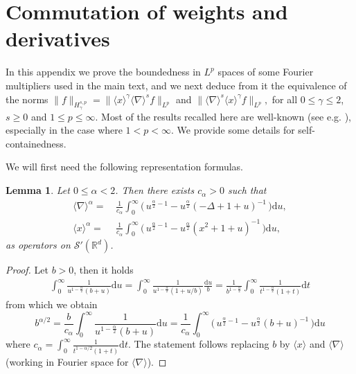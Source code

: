 \documentclass[12pt]{article}
\theoremstyle{plain}
\newtheorem{lemma}[theo]{Lemma}
\begin{document}
	
	\appendix
	
	\section{Commutation of weights and derivatives}

\label{app: commute}

In this appendix we prove the boundedness in $L^p$ spaces of some Fourier multipliers used in the main text, and we next deduce from it the equivalence of the norms $\|f\|_{H^{s,p}_\gamma}=\|\langle x \rangle ^\gamma \langle \nabla \rangle^s f \|_{L^p}$ and $\|\langle \nabla \rangle^s \langle x \rangle ^\gamma f \|_{L^p},$ for all $0\leq \gamma\leq 2$, $s\geq 0 $ and $1\le p \le \infty$. Most of the results recalled here are well-known (see e.g. \cite{Loefstroem}), especially in the case where $1<p<\infty$. We provide some details for self-containedness.

We will first need the following representation formulas.

\begin{lemma}
		\label{lemma: expr sqrt}
		Let $0\leq \alpha <2 $. Then there exists $c_\alpha>0$ such that 
		\begin{align*}
		    \langle \nabla \rangle^\alpha =&\, \frac{1}{c_\alpha} \int_0^\infty \big(\, u^{\frac\alpha2-1}- u^{\frac\alpha2} (-\Delta + 1 + u )^{-1}\, \big) \mathrm{d}u ,\\
		     \langle x \rangle^\alpha= &\,\frac{1}{c_\alpha} \int_0^\infty \big(\,u^{\frac\alpha2-1}- u^{\frac\alpha2} (x^2 +1+ u )^{-1}\, \big) \mathrm{d}u,
		\end{align*}
as operators on $\mathcal{S}'(\mathbb{R}^d)$.
	\end{lemma}
	\begin{proof}
		Let $ b>0$, then it holds
		\begin{align*}
			\int_0^\infty \frac{1}{u^{1-\frac\alpha2}(b+u)} \mathrm{d}u = \int_0^\infty \frac{1}{u^{1-\frac\alpha2}(1+u/b)}\frac{\mathrm{d}u}{b}= \frac{1}{b^{1-\frac\alpha2}}\int_0^\infty \frac{1}{t^{1-\frac\alpha2}(1+t)}\mathrm{d}t
		\end{align*}
		from which we obtain 
		\begin{equation*}
			b^{\alpha/2} = \frac{b}{c_\alpha} \int_0^\infty \frac{1}{u^{1-\frac\alpha2}(b+u)} \mathrm{d}u =  \frac{1}{c_\alpha} \int_0^\infty \big(\,u^{\frac\alpha2-1}- u^{\frac\alpha2} (b+ u )^{-1}\, \big) \mathrm{d}u 
		\end{equation*}
		where $c_\alpha=\int_0^\infty \frac{1}{t^{1-\alpha/2}(1+t)}\mathrm{d}t$. The statement follows replacing $b$ by $\langle x \rangle$ and $\langle \nabla \rangle$ (working in Fourier space for $\langle\nabla\rangle$).
	\end{proof}
	
\end{document}
